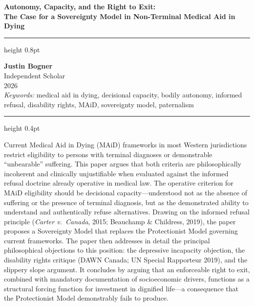 \documentclass[11pt, letterpaper]{article}
\begin{document}
\thispagestyle{empty}
\vspace*{0.6cm}

{\raggedright
{\sffamily\LARGE\bfseries\color{C@accent}
Autonomy, Capacity, and the Right to Exit: \\[0.3em]
\large The Case for a Sovereignty Model in Non-Terminal Medical Aid in Dying}
\par}

\vspace{0.6em}
{\color{C@rulegray}\hrule height 0.8pt}
\vspace{0.5em}

{\sffamily\small\color{C@midgray}
\textbf{Justin Bogner} \\
Independent Scholar \\
2026 \\[0.4em]
\textit{Keywords:} medical aid in dying, decisional capacity, bodily autonomy,
informed refusal, disability rights, MAiD, sovereignty model, paternalism
}

\vspace{0.5em}
{\color{C@rulegray}\hrule height 0.4pt}
\vspace{1.2em}

\begin{policybox}[title={\sffamily\bfseries\small\color{C@accent} Abstract}]
Current Medical Aid in Dying (MAiD) frameworks in most Western jurisdictions restrict
eligibility to persons with terminal diagnoses or demonstrable ``unbearable'' suffering.
This paper argues that both criteria are philosophically incoherent and clinically
unjustifiable when evaluated against the informed refusal doctrine already operative in
medical law. The operative criterion for MAiD eligibility should be decisional
capacity---understood not as the absence of suffering or the presence of terminal
diagnosis, but as the demonstrated ability to understand and authentically refuse
alternatives. Drawing on the informed refusal principle (\textit{Carter v.\ Canada},
2015; Beauchamp \& Childress, 2019), the paper proposes a Sovereignty Model that
replaces the Protectionist Model governing current frameworks. The paper then addresses
in detail the principal philosophical objections to this position: the depressive
incapacity objection, the disability rights critique (DAWN Canada; UN Special Rapporteur
2019), and the slippery slope argument. It concludes by arguing that an enforceable
right to exit, combined with mandatory documentation of socioeconomic drivers, functions
as a structural forcing function for investment in dignified life---a consequence that
the Protectionist Model demonstrably fails to produce.
\end{policybox}
\end{document}
